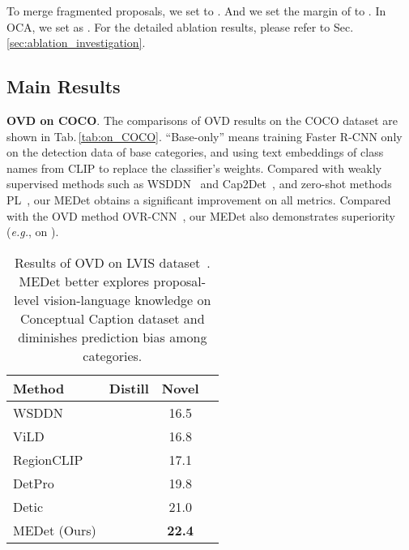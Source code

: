 \documentclass[10pt,twocolumn,letterpaper]{article}
\begin{document}
To merge fragmented proposals, we set  to . And we set the margin  of  to .
In OCA, we set  as .
For the detailed ablation results, please refer to Sec.\,\ref{sec:ablation_investigation}.

\subsection{Main Results}
\label{sec:main_results}
\textbf{OVD on COCO}.
The comparisons of OVD results on the COCO dataset are shown in Tab.\,\ref{tab:on_COCO}.
``Base-only'' means training Faster R-CNN only on the detection data of base categories, and using text embeddings of class names from CLIP to replace the classifier's weights.
Compared with weakly supervised methods such as WSDDN~\cite{wsddn} and Cap2Det~\cite{ye2019Cap2Det}, and zero-shot methods PL~\cite{rahman2020PL}, our MEDet obtains a significant improvement on all metrics.
Compared with the OVD method OVR-CNN~\cite{ovrcnn}, our MEDet also demonstrates superiority (\emph{e.g.},  \vs  on ).




\begin{table}[t]
   \centering
   \caption{Results of OVD on LVIS dataset~\cite{lvis}. MEDet better explores proposal-level vision-language knowledge on Conceptual Caption dataset and diminishes prediction bias among categories.}
    \footnotesize{
    \begin{tabular}{l|ccc}
        \toprule
Method & Distill & Novel & \color{gray}{All} \\
        \midrule
        WSDDN~\cite{wsddn} &  & 16.5  &\color{gray}{30.0}  \\
        ViLD~\cite{vild}   &  & 16.8  &\color{gray}{25.2}  \\
        RegionCLIP~\cite{regionCLIP} &  & 17.1  &\color{gray}{28.2}  \\
        DetPro~\cite{DetPro} &  & 19.8 &\color{gray}{25.9} \\
        Detic~\cite{detic} &  & 21.0  &\color{gray}{30.9}  \\
        \midrule
\rowcolor{gray!25} MEDet (Ours) &   & \textbf{22.4}  &\color{gray}{34.4} \\
        \bottomrule
    \end{tabular}
    \label{tab:on_LVIS}
    }
\end{table}
\end{document}
